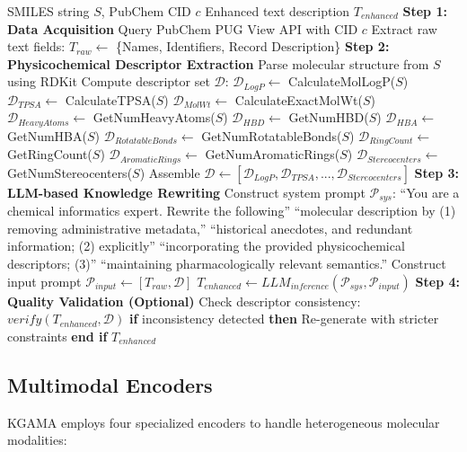 \documentclass[journal]{IEEEtran}
\begin{document}
\begin{algorithm}[H]
\caption{Knowledge Rewriting Pipeline}
\label{alg:knowledge_rewriting}
\begin{algorithmic}[1]
\REQUIRE SMILES string $S$, PubChem CID $c$
\ENSURE Enhanced text description $T_{enhanced}$
\STATE \textbf{Step 1: Data Acquisition}
\STATE Query PubChem PUG View API with CID $c$
\STATE Extract raw text fields: $T_{raw} \leftarrow$ \{Names, Identifiers, Record Description\}
\STATE \textbf{Step 2: Physicochemical Descriptor Extraction}
\STATE Parse molecular structure from $S$ using RDKit
\STATE Compute descriptor set $\mathcal{D}$:
\STATE \quad $\mathcal{D}_{LogP} \leftarrow$ CalculateMolLogP($S$)
\STATE \quad $\mathcal{D}_{TPSA} \leftarrow$ CalculateTPSA($S$)
\STATE \quad $\mathcal{D}_{MolWt} \leftarrow$ CalculateExactMolWt($S$)
\STATE \quad $\mathcal{D}_{HeavyAtoms} \leftarrow$ GetNumHeavyAtoms($S$)
\STATE \quad $\mathcal{D}_{HBD} \leftarrow$ GetNumHBD($S$)
\STATE \quad $\mathcal{D}_{HBA} \leftarrow$ GetNumHBA($S$)
\STATE \quad $\mathcal{D}_{RotatableBonds} \leftarrow$ GetNumRotatableBonds($S$)
\STATE \quad $\mathcal{D}_{RingCount} \leftarrow$ GetRingCount($S$)
\STATE \quad $\mathcal{D}_{AromaticRings} \leftarrow$ GetNumAromaticRings($S$)
\STATE \quad $\mathcal{D}_{Stereocenters} \leftarrow$ GetNumStereocenters($S$)
\STATE Assemble $\mathcal{D} \leftarrow [\mathcal{D}_{LogP}, \mathcal{D}_{TPSA}, ..., \mathcal{D}_{Stereocenters}]$
\STATE \textbf{Step 3: LLM-based Knowledge Rewriting}
\STATE Construct system prompt $\mathcal{P}_{sys}$:
\STATE \quad ``You are a chemical informatics expert. Rewrite the following''
\STATE \quad ``molecular description by (1) removing administrative metadata,''
\STATE \quad ``historical anecdotes, and redundant information; (2) explicitly''
\STATE \quad ``incorporating the provided physicochemical descriptors; (3)''
\STATE \quad ``maintaining pharmacologically relevant semantics.''
\STATE Construct input prompt $\mathcal{P}_{input} \leftarrow [T_{raw}, \mathcal{D}]$
\STATE $T_{enhanced} \leftarrow LLM_{inference}(\mathcal{P}_{sys}, \mathcal{P}_{input})$
\STATE \textbf{Step 4: Quality Validation (Optional)}
\STATE Check descriptor consistency: $verify(T_{enhanced}, \mathcal{D})$
\STATE \quad \textbf{if} inconsistency detected \textbf{then}
\STATE \quad \quad Re-generate with stricter constraints
\STATE \quad \textbf{end if}
\RETURN $T_{enhanced}$
\end{algorithmic}
\end{algorithm}

\subsection{Multimodal Encoders}
KGAMA employs four specialized encoders to handle heterogeneous molecular modalities:
\end{document}
